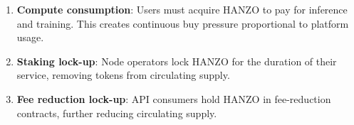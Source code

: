 \begin{enumerate}[leftmargin=1.4em]
    \item \textbf{Compute consumption}: Users must acquire HANZO to pay for
    inference and training. This creates continuous buy pressure proportional to
    platform usage.
    \item \textbf{Staking lock-up}: Node operators lock HANZO for the duration of
    their service, removing tokens from circulating supply.
    \item \textbf{Fee reduction lock-up}: API consumers hold HANZO in
    fee-reduction contracts, further reducing circulating supply.
\end{enumerate}

